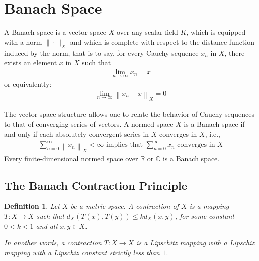 \documentclass[12pt,leqno]{amsart}
\newtheorem{definition}{Definition}[section]
\theoremstyle{definition}
\numberwithin{equation}{subsection}
\begin{document}
\medskip

\section{Banach Space}
A Banach space is a vector space $X$ over any scalar field $K$, which is equipped with a norm ${\|\cdot \|_{X}}$ and which is complete with respect to the distance function induced by the norm, that is to say, for every Cauchy sequence ${x_n}$ in $X$, there exists an element $x$ in $X$ such that 
\begin{align*}
    \lim_{n\to\infty}x_n = x
\end{align*}
or equivalently:
\begin{align*}
    \lim _{n\to \infty }\left\|x_{n} - x\right\|_{X} = 0
\end{align*}

The vector space structure allows one to relate the behavior of Cauchy sequences to that of converging series of vectors. A normed space $X$ is a Banach space if and only if each absolutely convergent series in $X$ converges in $X$, i.e.,
\begin{align*}
    \sum^\infty_{n=0}\left\|x_n\right\|_X < \infty\,\, \text{implies that}\,\, \sum^\infty_{n=0}x_n\,\,\text{converges in}\,\, X
\end{align*}
Every finite-dimensional normed space over $\mathbb{R}$ or $\mathbb{C}$ is a Banach space.

\medskip

\subsection{The Banach Contraction Principle}
\begin{definition}
Let $X$ be a metric space. A contraction of $X$ is a mapping $T:X\to X$ such that $d_X\left(T(x),T(y)\right)\leq kd_X\left(x,y\right)$, for some constant $0<k<1$ and all $x,y\in X$.

In another words, a contraction $T:X\to X$ is a Lipschitz mapping with a Lipschiz mapping with a Lipschiz constant strictly less than $1$.
\end{definition}

\medskip
\end{document}
